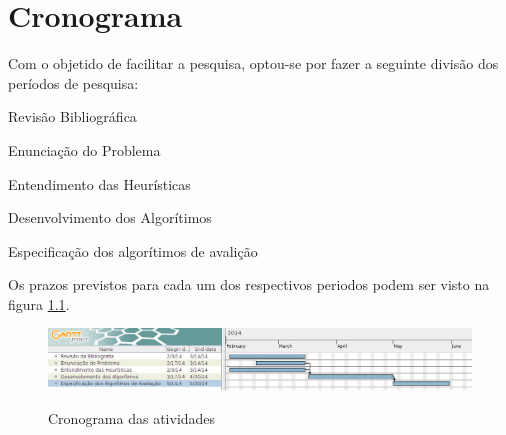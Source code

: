 \chapter{Cronograma}\label{cap:cronograma}

Com o objetido de facilitar a pesquisa, optou-se por
fazer a seguinte divisão dos períodos de pesquisa:
\begin{description}
  \item Revisão Bibliográfica
  \item Enunciação do Problema
  \item Entendimento das Heurísticas
  \item Desenvolvimento dos Algorítimos
  \item Especificação dos algorítimos de avalição
\end{description}
Os prazos previstos para cada um dos respectivos periodos
podem ser visto na figura \ref{cron}.

\begin{figure}[h!]
  \includegraphics[width = \linewidth]{imgs/cronograma}
  \label{cron}
  \caption{Cronograma das atividades}
  
\end{figure}